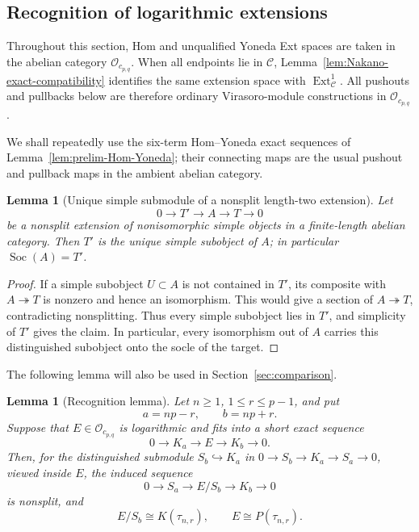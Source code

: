 \documentclass[12pt,leqno]{amsart}
\numberwithin{equation}{section}
\newtheorem{lem}[thm]{Lemma}
\newcommand{\Ext}{\operatorname{Ext}}
\newcommand{\Soc}{\operatorname{Soc}}
\newcommand{\Oc}{\mathcal O}
\begin{document}
\subsection{Recognition of logarithmic extensions}

Throughout this section, Hom and unqualified Yoneda Ext spaces are taken
in the abelian category $\Oc_{c_{p,q}}$.  When all endpoints lie in
$\mathscr C$, Lemma~\ref{lem:Nakano-exact-compatibility} identifies the
same extension space with $\Ext^1_{\mathscr C}$.  All pushouts and
pullbacks below are therefore ordinary Virasoro-module constructions in
$\Oc_{c_{p,q}}$.

We shall repeatedly use the six-term Hom--Yoneda exact sequences of
Lemma~\ref{lem:prelim-Hom-Yoneda}; their connecting maps are the usual
pushout and pullback maps in the ambient abelian category.

\begin{lem}[Unique simple submodule of a nonsplit length-two extension]
\label{lem:length-two-socle}
Let
\[
 0\longrightarrow T'\longrightarrow A\longrightarrow T\longrightarrow0
\]
be a nonsplit extension of nonisomorphic simple objects in a finite-length
abelian category.  Then $T'$ is the unique simple subobject of $A$; in
particular $\Soc(A)=T'$.
\end{lem}

\begin{proof}
If a simple subobject $U\subset A$ is not contained in $T'$, its composite
with $A\twoheadrightarrow T$ is nonzero and hence an isomorphism.  This
would give a section of $A\twoheadrightarrow T$, contradicting
nonsplitting.  Thus every simple subobject lies in $T'$, and simplicity of
$T'$ gives the claim.  In particular, every isomorphism out of $A$ carries
this distinguished subobject onto the socle of the target.
\end{proof}

The following lemma will also be used in Section~\ref{sec:comparison}.

\begin{lem}[Recognition lemma]\label{lem:Nakano-recognition}
Let $n\ge1$, $1\le r\le p-1$, and put
\[
 a=np-r,\qquad b=np+r.
\]
Suppose that $E\in\Oc_{c_{p,q}}$ is logarithmic and fits into a short
exact sequence
\begin{equation}\label{eq:recognition-extension}
 0\longrightarrow K_a\longrightarrow E\longrightarrow K_b
 \longrightarrow0.
\end{equation}
Then, for the distinguished submodule $S_b\hookrightarrow K_a$ in
$0\to S_b\to K_a\to S_a\to0$, viewed inside $E$, the induced sequence
\[
 0\longrightarrow S_a\longrightarrow E/S_b\longrightarrow K_b
 \longrightarrow0
\]
is nonsplit, and
\[
 E/S_b\cong K(\tau_{n,r}),\qquad
 E\cong P(\tau_{n,r}).
\]
\end{lem}
\end{document}
